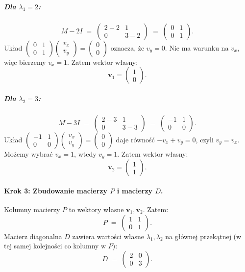 \subparagraph{Dla \(\lambda_1 = 2\):}
\[
M - 2I 
\;=\;
\begin{pmatrix}
2-2 & 1 \\
0 & 3-2
\end{pmatrix}
\;=\;
\begin{pmatrix}
0 & 1 \\
0 & 1
\end{pmatrix}.
\]
Układ \(\begin{pmatrix}0 & 1\\0 & 1\end{pmatrix} \begin{pmatrix}v_x\\v_y\end{pmatrix} = \begin{pmatrix}0\\0\end{pmatrix}\)
oznacza, że \(v_y = 0\). Nie ma warunku na \(v_x\), więc bierzemy \(v_x = 1\). 
Zatem wektor własny:
\[
\mathbf{v}_1 = \begin{pmatrix} 1 \\ 0 \end{pmatrix}.
\]

\subparagraph{Dla \(\lambda_2 = 3\):}
\[
M - 3I 
\;=\;
\begin{pmatrix}
2-3 & 1 \\
0 & 3-3
\end{pmatrix}
\;=\;
\begin{pmatrix}
-1 & 1 \\
0  & 0
\end{pmatrix}.
\]
Układ \(\begin{pmatrix}-1 & 1\\0 & 0\end{pmatrix}\begin{pmatrix}v_x\\v_y\end{pmatrix} = \begin{pmatrix}0\\0\end{pmatrix}\)
daje równość \(-v_x + v_y = 0\), czyli \(v_y = v_x\). Możemy wybrać \(v_x = 1\), wtedy \(v_y = 1\).
Zatem wektor własny:
\[
\mathbf{v}_2 = \begin{pmatrix} 1 \\ 1 \end{pmatrix}.
\]

\paragraph{Krok 3: Zbudowanie macierzy \(P\) i macierzy \(D\).}
Kolumny macierzy \(P\) to wektory własne \(\mathbf{v}_1, \mathbf{v}_2\). Zatem:
\[
P \;=\;
\begin{pmatrix}
1 & 1 \\
0 & 1
\end{pmatrix}.
\]
Macierz diagonalna \(D\) zawiera wartości własne \(\lambda_1, \lambda_2\) na głównej przekątnej (w tej samej kolejności co kolumny w \(P\)):
\[
D \;=\;
\begin{pmatrix}
2 & 0 \\
0 & 3
\end{pmatrix}.
\]

